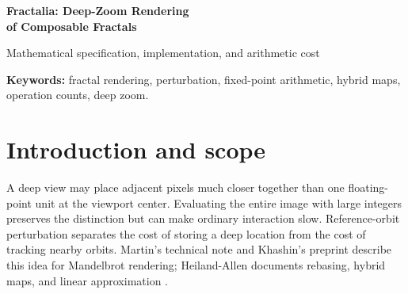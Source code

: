 \documentclass[11pt,a4paper]{article}
\numberwithin{equation}{section}
\begin{document}
\thispagestyle{plain}
\begin{center}
  \vspace*{0.8em}
  {\LARGE\bfseries\color{ink}Fractalia: Deep-Zoom Rendering\\[3pt]
   of Composable Fractals\par}
  \vspace{0.65em}
  {\small Mathematical specification, implementation, and arithmetic cost\par}
\end{center}

\begin{abstract}
Fractalia is a browser renderer for 24 orbit primitives, their cyclic
compositions, and periodically forced logistic maps. This report specifies
the maps and their observables, derives the differences used to share
high-precision reference orbits, and describes the conditions for accepting
an approximation or evaluating a pixel directly. An operation-count model
covers all 52 presets and one mixed Warp recipe. Between magnifications
\(10^{12}\) and \(10^{100}\), it predicts an \(8.18\)-fold increase in
direct arithmetic work for binary fixed-point kernels with a fixed operation
mix, and a \(15.45\)-fold increase for Warp because its residual sine
polynomial also gains terms. Archived frame timings show why these ratios
do not predict latency across regions or rendering paths. We distinguish
established methods, engine-specific engineering and measurements, and
candidates for further study. The evidence supports an implementation and
evaluation contribution; it does not establish a new general perturbation
method or priority for the individual identities.
\end{abstract}

{\small\textbf{Keywords:} fractal rendering, perturbation, fixed-point
arithmetic, hybrid maps, operation counts, deep zoom.}

\setcounter{tocdepth}{1}
\tableofcontents
\clearpage

\section{Introduction and scope}\label{sec:intro}

A deep view may place adjacent pixels much closer together than one
floating-point unit at the viewport center. Evaluating the entire image with
large integers preserves the distinction but can make ordinary interaction
slow. Reference-orbit perturbation separates the cost of storing a deep
location from the cost of tracking nearby orbits. Martin's technical note and
Khashin's preprint describe this idea for Mandelbrot rendering; Heiland-Allen
documents rebasing, hybrid maps, and linear approximation
\cite{martin,khashin,heiland,fraktaler}.
\end{document}
